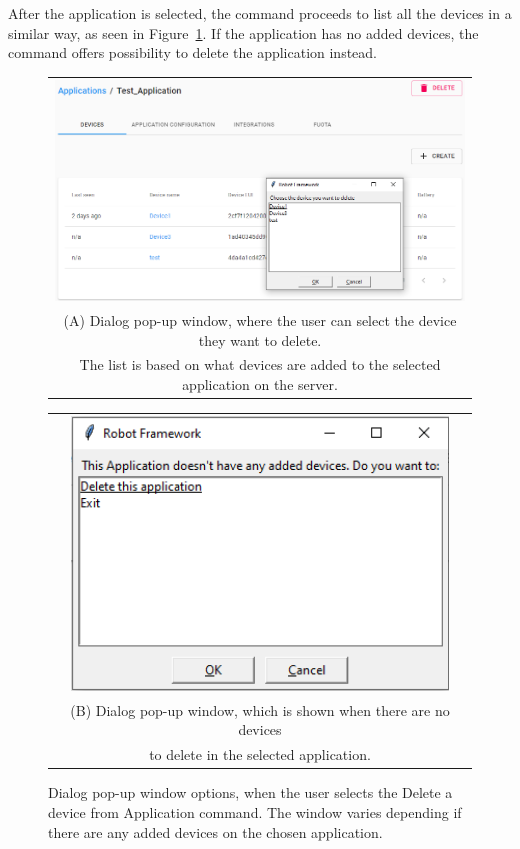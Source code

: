 After the application is selected, the command proceeds to list all the devices in a similar way, as seen in Figure~\ref{fig:delete_device_from_application_choose_device}.
If the application has no added devices, the command offers possibility to delete the application instead.

\begin{figure}
  \centering
  \begin{tabular}{@{}c@{}}
    \includegraphics[width=\textwidth]{illustration/delete_device_from_app_choose_device_dialog_application_on_back.PNG} \\[\abovecaptionskip]
    \small (A) Dialog pop-up window, where the user can select the device they want to delete. \\ The list is based on what devices are added to the selected application on the server.
  \end{tabular}

  \vspace{\floatsep}

  \begin{tabular}{@{}c@{}}
    \includegraphics[width=10cm]{illustration/no_devices_to_delete.PNG} \\[\abovecaptionskip]
    \small (B) Dialog pop-up window, which is shown when there are no devices \\ to delete in the selected application.
  \end{tabular}

  \caption{Dialog pop-up window options, when the user selects the Delete a device from Application command. The window varies depending if there are any added devices on the chosen application.}\label{fig:delete_device_from_application_choose_device}
\end{figure}

